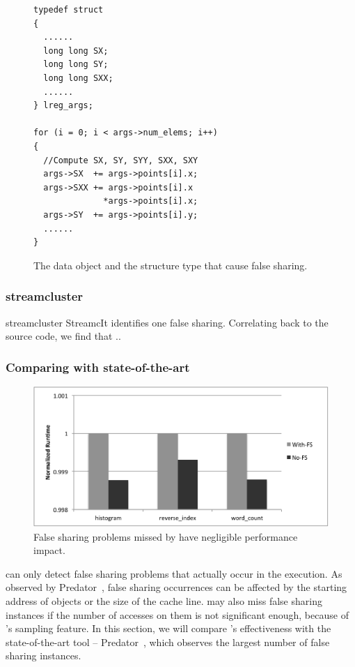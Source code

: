 \begin{figure}
\begin{verbatim}
typedef struct
{
  ......  
  long long SX;
  long long SY;
  long long SXX;
  ......
} lreg_args;	

for (i = 0; i < args->num_elems; i++)
{
  //Compute SX, SY, SYY, SXX, SXY
  args->SX  += args->points[i].x;
  args->SXX += args->points[i].x
              *args->points[i].x;
  args->SY  += args->points[i].y;
  ......
}
\end{verbatim}
\caption{The data object and the structure type that cause false sharing.}
\label{lr:code}
\end{figure}

\subsubsection{streamcluster}

streamcluster 
StreamcIt identifies one false sharing. Correlating back to the source code, we find that ..


\subsubsection{Comparing with state-of-the-art}

\begin{figure}[htbp]
\centering
\label{fig:fseffectiveness}
\includegraphics[width=.8\columnwidth]{figure/trivial}
\caption{False sharing problems missed by \cheetah{} have negligible performance impact.}
\end{figure}

\cheetah{} can only detect false sharing problems that actually occur in the execution. As observed by Predator~\cite{Predator}, false sharing occurrences can be affected by the starting address of objects or the size of the cache line. \cheetah{} may also miss false sharing instances if the number of accesses on them is not significant enough, because of \cheetah{}'s sampling feature. In this section, we will compare \cheetah{}'s effectiveness with the state-of-the-art tool -- Predator~\cite{Predator}, which observes the largest number of false sharing instances. 

